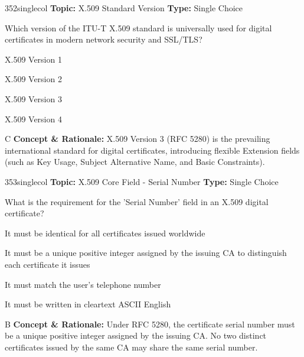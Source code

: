 \begin{qcard}{352}{singlecol}
\textcolor{darkslate!75}{\small\textbf{Topic:} X.509 Standard Version \hfill \textbf{Type:} Single Choice}\vspace{0.4em}\par
Which version of the ITU-T X.509 standard is universally used for digital certificates in modern network security and SSL/TLS?
\begin{qoptions}
\item X.509 Version 1
\item X.509 Version 2
\item X.509 Version 3
\item X.509 Version 4
\end{qoptions}
\end{qcard}
\nopagebreak
\begin{explainbox}{C}
\textbf{Concept \& Rationale:} X.509 Version 3 (RFC 5280) is the prevailing international standard for digital certificates, introducing flexible Extension fields (such as Key Usage, Subject Alternative Name, and Basic Constraints).
\end{explainbox}

\begin{qcard}{353}{singlecol}
\textcolor{darkslate!75}{\small\textbf{Topic:} X.509 Core Field - Serial Number \hfill \textbf{Type:} Single Choice}\vspace{0.4em}\par
What is the requirement for the 'Serial Number' field in an X.509 digital certificate?
\begin{qoptions}
\item It must be identical for all certificates issued worldwide
\item It must be a unique positive integer assigned by the issuing CA to distinguish each certificate it issues
\item It must match the user's telephone number
\item It must be written in cleartext ASCII English
\end{qoptions}
\end{qcard}
\nopagebreak
\begin{explainbox}{B}
\textbf{Concept \& Rationale:} Under RFC 5280, the certificate serial number must be a unique positive integer assigned by the issuing CA. No two distinct certificates issued by the same CA may share the same serial number.
\end{explainbox}

